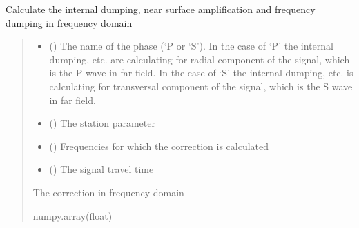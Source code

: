 \documentclass[letterpaper,10pt,english]{sphinxmanual}
\begin{document}
\begin{fulllineitems}
\label{\detokenize{api_support:amw.mw.parameters.get_correction}}
\pysigstartsignatures
{}
\pysigstopsignatures
\sphinxAtStartPar
Calculate the internal dumping, near surface amplification and frequency dumping in frequency domain
\begin{quote}\begin{description}
\begin{itemize}
\item {} 
\sphinxAtStartPar
{} () \textendash{} The name of the phase (‘P or ‘S’). In the case of ‘P’ the internal dumping, etc. are calculating
for radial component of the signal, which is the P wave in far field. In the case of ‘S’ the internal dumping,
etc. is calculating for transversal component of the signal, which is the S wave in far field.

\item {} 
\sphinxAtStartPar
{} () \textendash{} The station parameter

\item {} 
\sphinxAtStartPar
{} (\sphinxstyleliteralemphasis{\sphinxupquote{(}}\sphinxstyleliteralemphasis{\sphinxupquote{)}}) \textendash{} Frequencies for which the correction is calculated

\item {} 
\sphinxAtStartPar
{} () \textendash{} The signal travel time

\end{itemize}

\sphinxAtStartPar
The correction in frequency domain

\sphinxAtStartPar
numpy.array(float)

\end{description}\end{quote}

\end{fulllineitems}
\end{document}
